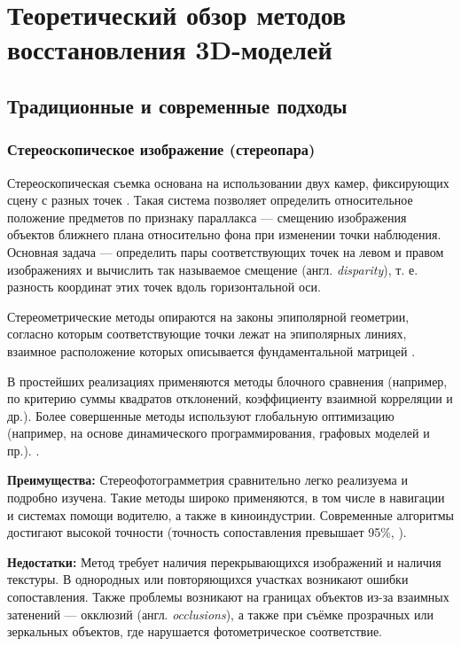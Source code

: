 \chapter{Теоретический обзор методов восстановления 3D-моделей}

\section{Традиционные и современные подходы}

\subsection{Стереоскопическое изображение (стереопара)}

Стереоскопическая съемка  основана на использовании двух камер, фиксирующих
сцену с разных точек \cite{ussr1981phototech}.  Такая система позволяет
определить относительное положение предметов по признаку параллакса — смещению
изображения объектов ближнего плана относительно фона при изменении точки
наблюдения.  Основная задача — определить пары соответствующих точек на левом и
правом изображениях и вычислить так называемое смещение (англ. \emph{disparity}), т.
е.  разность координат этих точек вдоль горизонтальной оси.

Стереометрические методы опираются на законы эпиполярной геометрии,
согласно которым соответствующие точки лежат на эпиполярных линиях, взаимное
расположение которых описывается фундаментальной матрицей \cite{Hartley:2003:MVG:861369}.

В простейших реализациях применяются методы блочного сравнения (например, по
критерию суммы квадратов отклонений, коэффициенту взаимной корреляции и др.).
Более совершенные методы используют глобальную оптимизацию (например, на основе
динамического программирования, графовых моделей и пр.). \cite{kok2019reviewonsterevision}.

\textbf{Преимущества:} Стереофотограмметрия сравнительно легко реализуема и
подробно изучена. Такие методы широко применяются, в том числе в навигации и
системах помощи водителю, а также в киноиндустрии. Современные алгоритмы
достигают высокой точности (точность сопоставления превышает 95\%,
\cite{fsian2022comparisonstereomatchingalgorithms}).

\textbf{Недостатки:} Метод требует наличия перекрывающихся изображений и
наличия текстуры. В однородных или повторяющихся участках возникают ошибки
сопоставления. Также проблемы возникают на границах объектов из-за взаимных
затенений — окклюзий (англ. \emph{occlusions}), а также при съёмке прозрачных или
зеркальных объектов, где нарушается фотометрическое соответствие.

